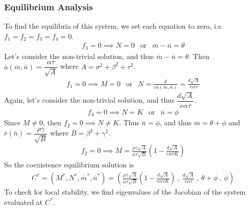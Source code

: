\documentclass[12pt]{article}
\begin{document}
\subsubsection*{Equilibrium Analysis}
To find the equilibria of this system, we set each equation to zero, i.e. $f_1 = f_2 = f_3 = f_4 = 0$.
\begin{align*}
	f_3 = 0 \implies N = 0 \ \ \text{ or }\ \  \overline{m} - \overline{n} = \theta
\end{align*}
Let's consider the non-trivial solution, and thus $\overline{m} - \overline{n} = \theta$.  Then $\overline{a}(\overline{m}, \overline{n}) = \dfrac{\alpha\tau}{\sqrt{A}}$ where $A = \sigma^2 + \beta^2 + \tau^2$.
\begin{align*}
	f_1 = 0 \implies M = 0 \ \ \text{ or }\ \  N = \frac{d}{e\overline{a}(\overline{m}, \overline{n})} = \frac{d\sqrt{A}}{e\alpha\tau}
\end{align*}
Again, let's consider the non-trivial solution, and thus $\dfrac{d\sqrt{A}}{e\alpha\tau}$.
\begin{align*}
	f_4 = 0 \implies N = K \ \ \text{ or }\ \ \overline{n} = \phi
\end{align*}
Since $M \neq 0$, then $f_2 = 0 \implies N \neq K$.  Thus $\overline{n} = \phi$, and thus $\overline{m} = \theta + \phi$ and $\overline{r}(\overline{n}) = \dfrac{\rho \gamma}{\sqrt{B}}$ where $ B = \beta^2 + \gamma^2 $.
\begin{align*}
	f_2 = 0 \implies M = \frac{\rho \gamma \sqrt{A}}{\alpha\tau\sqrt{B}}\left(1 - \frac{d\sqrt{A}}{e\alpha\tau K}\right)
\end{align*}
So the coexistence equilibrium solution is
\begin{align*}
	C^* = (M^*, N^*, \overline{m}^*, \overline{n}^*) = \left(\frac{\rho\gamma\sqrt{A}}{\alpha\tau\sqrt{B}}\left(1 - \frac{d\sqrt{A}}{e\alpha\tau K}\right)\ ,\ \frac{d\sqrt{A}}{e\alpha\tau}\ ,\ \theta + \phi\ ,\ \phi\right)
\end{align*}
To check for local stability, we find eigenvalues of the Jacobian of the system evaluated at $C^*$.
\end{document}
